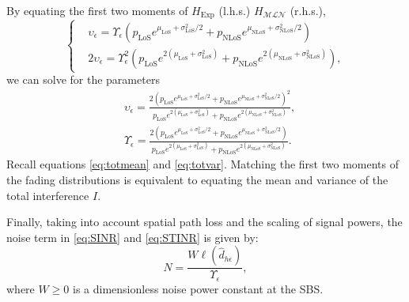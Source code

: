 \documentclass[lettersize,journal]{IEEEtran}
\begin{document}
By equating the first two moments of $H_{\text{Exp}}$ (l.h.s.) $H_{\mathcal{M} \mathcal{L}\mathcal{N}}$ (r.h.s.),
\begin{equation}
  \label{eq:matchingmoments}
  \begin{cases}
    &\upsilon_{\epsilon} = \Upsilon_{\epsilon} \left(p_{\text{LoS}} e^{\mu_{\text{LoS}} + \sigma_{\text{LoS}}^2/2} + p_{\text{NLoS}} e^{\mu_{\text{NLoS}} + \sigma_{\text{NLoS}}^2/2}\right)\\
    &2\upsilon_{\epsilon}= \Upsilon_{\epsilon}^2 \left( p_{\text{LoS}} e^{2(\mu_{\text{LoS}} + \sigma_{\text{LoS}}^2)} + p_{\text{NLoS}} e^{2(\mu_{\text{NLoS}} + \sigma_{\text{NLoS}}^2)} \right), 
  \end{cases}
\end{equation}
we can solve for the parameters
\begin{align}
  \label{eq:epsilonandupsilon}
  & \upsilon_{\epsilon}= \frac{ 2\left( p_{\text{LoS}}e^{\mu_{\text{LoS}}+\sigma^2_{\text{LoS}}/2}+p_{\text{NLoS}}e^{\mu_{\text{NLoS}}+\sigma^2_{\text{NLoS}}/2} \right)^2}{p_{\text{LoS}}e^{2(\mu_{\text{LoS}}+\sigma_{\text{LoS}}^2)}+p_{\text{NLoS}}e^{2(\mu_{\text{NLoS}}+\sigma_{\text{NLoS}}^2)}}, \\ 
    &\Upsilon_{\epsilon} = \frac{2\left(p_{\text{LoS}}e^{\mu_{\text{LoS}}+\sigma^2_{\text{LoS}}/2}+p_{\text{NLoS}}e^{\mu_{\text{NLoS}}+\sigma^2_{\text{NLoS}}/2}\right)}{p_{\text{LoS}}e^{2(\mu_{\text{LoS}}+\sigma_{\text{LoS}}^2)}+p_{\text{NLoS}}e^{2(\mu_{\text{NLoS}}+\sigma_{\text{NLoS}}^2)}}.
\end{align}
Recall equations \eqref{eq:totmean} and \eqref{eq:totvar}. Matching the first two moments of the fading distributions is equivalent to equating the mean and variance of the total interference $I$.



Finally, taking into account spatial path loss and the scaling of signal powers, the noise term in \eqref{eq:SINR} and \eqref{eq:STINR} is given by:
\begin{equation}
N = \frac{W \ell(\hat{d}_{h\epsilon})}{\Upsilon_{\epsilon}},
\end{equation}
where $W \geq 0$ is a dimensionless noise power constant at the SBS.
\end{document}
